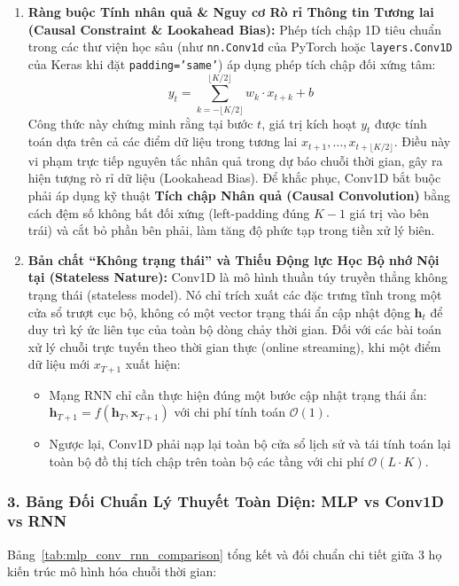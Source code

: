 \documentclass[12pt,a4paper]{report}
\begin{document}
\begin{enumerate}
    \item \textbf{Ràng buộc Tính nhân quả \& Nguy cơ Rò rỉ Thông tin Tương lai (Causal Constraint \& Lookahead Bias):}
    Phép tích chập 1D tiêu chuẩn trong các thư viện học sâu (như \texttt{nn.Conv1d} của PyTorch hoặc \texttt{layers.Conv1D} của Keras khi đặt \texttt{padding='same'}) áp dụng phép tích chập đối xứng tâm:
    \begin{equation}
        y_t = \sum_{k = -\lfloor K/2 \rfloor}^{\lfloor K/2 \rfloor} w_k \cdot x_{t+k} + b
    \end{equation}
    Công thức này chứng minh rằng tại bước $t$, giá trị kích hoạt $y_t$ được tính toán dựa trên cả các điểm dữ liệu trong tương lai $x_{t+1}, \dots, x_{t+\lfloor K/2 \rfloor}$. Điều này vi phạm trực tiếp nguyên tắc nhân quả trong dự báo chuỗi thời gian, gây ra hiện tượng rò rỉ dữ liệu (Lookahead Bias). Để khắc phục, Conv1D bắt buộc phải áp dụng kỹ thuật \textbf{Tích chập Nhân quả (Causal Convolution)} bằng cách đệm số không bất đối xứng (left-padding đúng $K - 1$ giá trị vào bên trái) và cắt bỏ phần bên phải, làm tăng độ phức tạp trong tiền xử lý biên.

    \item \textbf{Bản chất “Không trạng thái” và Thiếu Động lực Học Bộ nhớ Nội tại (Stateless Nature):}
    Conv1D là mô hình thuần túy truyền thẳng không trạng thái (stateless model). Nó chỉ trích xuất các đặc trưng tĩnh trong một cửa sổ trượt cục bộ, không có một vector trạng thái ẩn cập nhật động $\mathbf{h}_t$ để duy trì ký ức liên tục của toàn bộ dòng chảy thời gian. Đối với các bài toán xử lý chuỗi trực tuyến theo thời gian thực (online streaming), khi một điểm dữ liệu mới $x_{T+1}$ xuất hiện:
    \begin{itemize}
        \item Mạng RNN chỉ cần thực hiện đúng một bước cập nhật trạng thái ẩn: $\mathbf{h}_{T+1} = f(\mathbf{h}_T, \mathbf{x}_{T+1})$ với chi phí tính toán $\mathcal{O}(1)$.
        \item Ngược lại, Conv1D phải nạp lại toàn bộ cửa sổ lịch sử và tái tính toán lại toàn bộ đồ thị tích chập trên toàn bộ các tầng với chi phí $\mathcal{O}(L \cdot K)$.
    \end{itemize}
\end{enumerate}

\subsubsection{3. Bảng Đối Chuẩn Lý Thuyết Toàn Diện: MLP vs Conv1D vs RNN}
Bảng~\ref{tab:mlp_conv_rnn_comparison} tổng kết và đối chuẩn chi tiết giữa 3 họ kiến trúc mô hình hóa chuỗi thời gian:
\end{document}
